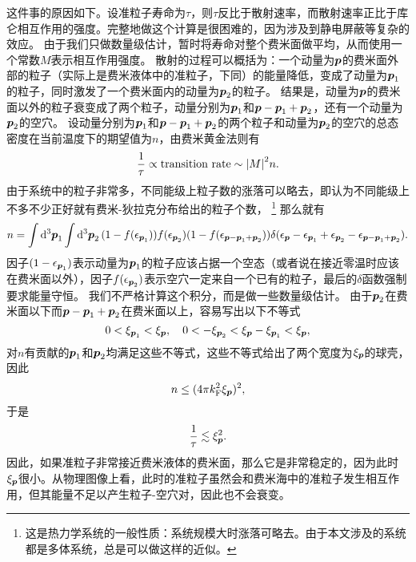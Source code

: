 \documentclass[hyperref, UTF8, a4paper]{ctexart}
\begin{document}
这件事的原因如下。设准粒子寿命为$\tau$，则$\tau$反比于散射速率，而散射速率正比于库仑相互作用的强度。完整地做这个计算是很困难的，因为涉及到静电屏蔽等复杂的效应。
由于我们只做数量级估计，暂时将寿命对整个费米面做平均，从而使用一个常数$M$表示相互作用强度。
散射的过程可以概括为：一个动量为$\vb*{p}$的费米面外部的粒子（实际上是费米液体中的准粒子，下同）的能量降低，变成了动量为$\vb*{p}_1$的粒子，同时激发了一个费米面内的动量为$\vb*{p}_2$的粒子。
结果是，动量为$\vb*{p}$的费米面以外的粒子衰变成了两个粒子，动量分别为$\vb*{p}_1$和$\vb*{p} - \vb*{p}_1 + \vb*{p}_2$，还有一个动量为$\vb*{p}_2$的空穴。
设动量分别为$\vb*{p}_1$和$\vb*{p} - \vb*{p}_1 + \vb*{p}_2$的两个粒子和动量为$\vb*{p}_2$的空穴的总态密度在当前温度下的期望值为$n$，由费米黄金法则有
\[
    \frac{1}{\tau} \propto \text{transition rate} \sim \abs{M}^2 n.
\]
由于系统中的粒子非常多，不同能级上粒子数的涨落可以略去，即认为不同能级上不多不少正好就有费米-狄拉克分布给出的粒子个数，%
\footnote{这是热力学系统的一般性质：系统规模大时涨落可略去。由于本文涉及的系统都是多体系统，总是可以做这样的近似。}%
那么就有
\[
    n = \int \dd[3]{\vb*{p}_1} \int \dd[3]{\vb*{p}_2} (1 - f(\epsilon_{\vb*{p}_1})) f(\epsilon_{\vb*{p}_2}) (1 - f(\epsilon_{\vb*{p} - \vb*{p}_1 + \vb*{p}_2})) \delta(\epsilon_{\vb*{p}} - \epsilon_{\vb*{p}_1} + \epsilon_{\vb*{p}_2} - \epsilon_{\vb*{p} - \vb*{p}_1 + \vb*{p}_2}).
\]
因子$(1-\epsilon_{\vb*{p}_1})$表示动量为$\vb*{p}_1$的粒子应该占据一个空态（或者说在接近零温时应该在费米面以外），因子$f(\epsilon_{\vb*{p}_2})$表示空穴一定来自一个已有的粒子，最后的$\delta$函数强制要求能量守恒。
我们不严格计算这个积分，而是做一些数量级估计。
由于$\vb*{p}_2$在费米面以下而$\vb*{p}- \vb*{p}_1 + \vb*{p}_2$在费米面以上，容易写出以下不等式
\[
    0 < \xi_{\vb*{p}_1} < \xi_{\vb*{p}}, \quad 0 < - \xi_{\vb*{p}_2} < \xi_{\vb*{p}} - \xi_{\vb*{p}_1} < \xi_{\vb*{p}},
\]
对$n$有贡献的$\vb*{p}_1$和$\vb*{p}_2$均满足这些不等式，这些不等式给出了两个宽度为$\xi_{\vb*{p}}$的球壳，因此
\[
    n \leq (4 \pi k_\text{F}^2 \xi_{\vb*{p}})^2,
\]
于是
\begin{equation}
    \frac{1}{\tau} \lesssim \xi_{\vb*{p}}^2.
\end{equation}
因此，如果准粒子非常接近费米液体的费米面，那么它是非常稳定的，因为此时$\xi_{\vb*{p}}$很小。从物理图像上看，此时的准粒子虽然会和费米海中的准粒子发生相互作用，但其能量不足以产生粒子-空穴对，因此也不会衰变。
\end{document}

